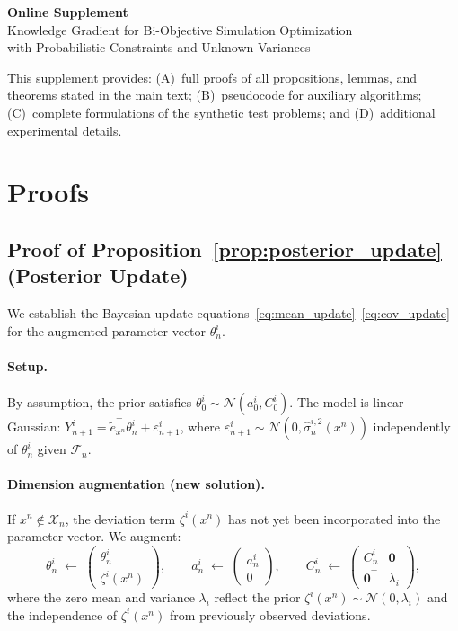 \documentclass[12pt]{article}
\theoremstyle{plain}
\theoremstyle{definition}
\theoremstyle{remark}
\begin{document}
\begin{center}
  {\Large\textbf{Online Supplement}}\\[6pt]
  {\large Knowledge Gradient for Bi-Objective Simulation Optimization\\
  with Probabilistic Constraints and Unknown Variances}
\end{center}

\medskip
This supplement provides: (A)~full proofs of all propositions, lemmas, and
theorems stated in the main text; (B)~pseudocode for auxiliary algorithms;
(C)~complete formulations of the synthetic test problems; and
(D)~additional experimental details.

\section{Proofs}\label{app:proofs}

\subsection{Proof of Proposition~\ref{prop:posterior_update} (Posterior Update)}\label{app:proof_posterior}

We establish the Bayesian update equations~\eqref{eq:mean_update}--\eqref{eq:cov_update}
for the augmented parameter vector $\theta^i_n$.

\paragraph{Setup.}
By assumption, the prior satisfies $\theta^i_0 \sim \mathcal{N}(a^i_0, C^i_0)$.
The model is linear-Gaussian:
$Y^i_{n+1} = \tilde{e}_{x^n}^\top \theta^i_n + \varepsilon^i_{n+1}$,
where $\varepsilon^i_{n+1} \sim \mathcal{N}(0, \hat{\sigma}^{i,2}_n(x^n))$
independently of $\theta^i_n$ given $\mathcal{F}_n$.

\paragraph{Dimension augmentation (new solution).}
If $x^n \notin \mathcal{X}_n$, the deviation term $\zeta^i(x^n)$ has not yet
been incorporated into the parameter vector.  We augment:
\[
  \theta^i_n \;\leftarrow\;
  \begin{pmatrix} \theta^i_n \\ \zeta^i(x^n) \end{pmatrix},
  \qquad
  a^i_n \;\leftarrow\; \begin{pmatrix} a^i_n \\ 0 \end{pmatrix},
  \qquad
  C^i_n \;\leftarrow\; \begin{pmatrix} C^i_n & \mathbf{0} \\ \mathbf{0}^\top & \lambda_i \end{pmatrix},
\]
where the zero mean and variance $\lambda_i$ reflect the prior
$\zeta^i(x^n) \sim \mathcal{N}(0, \lambda_i)$ and the independence of
$\zeta^i(x^n)$ from previously observed deviations.
\end{document}
